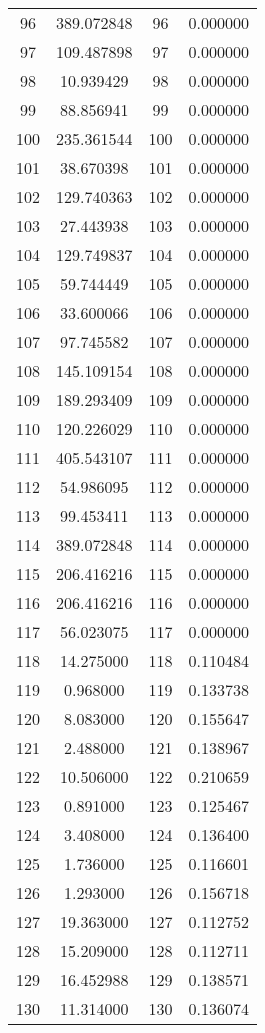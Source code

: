 \documentclass[12pt]{article}
\begin{document}
\begin{longtable}{@{}cccc@{}}
96 & 389.072848 & 96 & 0.000000 \\
97 & 109.487898 & 97 & 0.000000 \\
98 & 10.939429 & 98 & 0.000000 \\
99 & 88.856941 & 99 & 0.000000 \\
100 & 235.361544 & 100 & 0.000000 \\
101 & 38.670398 & 101 & 0.000000 \\
102 & 129.740363 & 102 & 0.000000 \\
103 & 27.443938 & 103 & 0.000000 \\
104 & 129.749837 & 104 & 0.000000 \\
105 & 59.744449 & 105 & 0.000000 \\
106 & 33.600066 & 106 & 0.000000 \\
107 & 97.745582 & 107 & 0.000000 \\
108 & 145.109154 & 108 & 0.000000 \\
109 & 189.293409 & 109 & 0.000000 \\
110 & 120.226029 & 110 & 0.000000 \\
111 & 405.543107 & 111 & 0.000000 \\
112 & 54.986095 & 112 & 0.000000 \\
113 & 99.453411 & 113 & 0.000000 \\
114 & 389.072848 & 114 & 0.000000 \\
115 & 206.416216 & 115 & 0.000000 \\
116 & 206.416216 & 116 & 0.000000 \\
117 & 56.023075 & 117 & 0.000000 \\
118 & 14.275000 & 118 & 0.110484 \\
119 & 0.968000 & 119 & 0.133738 \\
120 & 8.083000 & 120 & 0.155647 \\
121 & 2.488000 & 121 & 0.138967 \\
122 & 10.506000 & 122 & 0.210659 \\
123 & 0.891000 & 123 & 0.125467 \\
124 & 3.408000 & 124 & 0.136400 \\
125 & 1.736000 & 125 & 0.116601 \\
126 & 1.293000 & 126 & 0.156718 \\
127 & 19.363000 & 127 & 0.112752 \\
128 & 15.209000 & 128 & 0.112711 \\
129 & 16.452988 & 129 & 0.138571 \\
130 & 11.314000 & 130 & 0.136074 \\

\end{longtable}
\end{document}
